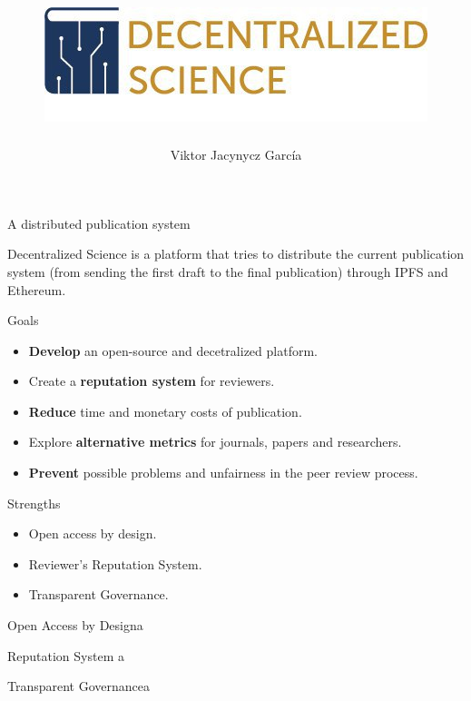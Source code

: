 \documentclass{beamer}
\title[Decentralized Science]{\includegraphics[width=0.6\linewidth]{img/logo.jpg}}
\author[V. Jacynycz]{Viktor Jacynycz Garc\'ia}
\institute[UCM] %
{
  Grupo Grasia\\
  Facultad de informática\\
  Universidad Complutense de Madrid \\ %
  \medskip
  \textit{vsjg@ucm.es} %
}
\date{} %
\newcommand{\framet}[3]{
  \begin{frame}{#1}
    #2
  \end{frame}
}
\begin{document}
\begin{frame}
\titlepage %
\end{frame}

\framet{A distributed publication system}{
Decentralized Science is a platform that tries to distribute the current publication system (from sending the first draft to the final publication) through IPFS and Ethereum.
}

\framet{Goals}{
\begin{itemize}
  \item \textbf{Develop} an open-source and decetralized platform.
  \item Create a \textbf{reputation system} for reviewers.
  \item \textbf{Reduce} time and monetary costs of publication.
  \item Explore \textbf{alternative metrics} for journals, papers and researchers.
  \item \textbf{Prevent} possible problems and unfairness in the peer review process.
\end{itemize}
}

\framet{Strengths}{
\begin{itemize}
  \item Open access by design.
  \item Reviewer's Reputation System.
  \item Transparent Governance.
\end{itemize}
}

\framet{Open Access by Design}{a}

\framet{Reputation System}{a}

\framet{Transparent Governance}{a}

%  
%
\end{document}
